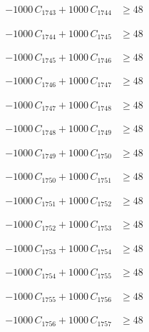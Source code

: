 \documentclass[a4paper,11pt]{article}
\begin{document}
\begin{align}
-1000\,C_{1743} + 1000\,C_{1744} &\geq 48 \nonumber
\end{align}

\begin{align}
-1000\,C_{1744} + 1000\,C_{1745} &\geq 48 \nonumber
\end{align}

\begin{align}
-1000\,C_{1745} + 1000\,C_{1746} &\geq 48 \nonumber
\end{align}

\begin{align}
-1000\,C_{1746} + 1000\,C_{1747} &\geq 48 \nonumber
\end{align}

\begin{align}
-1000\,C_{1747} + 1000\,C_{1748} &\geq 48 \nonumber
\end{align}

\begin{align}
-1000\,C_{1748} + 1000\,C_{1749} &\geq 48 \nonumber
\end{align}

\begin{align}
-1000\,C_{1749} + 1000\,C_{1750} &\geq 48 \nonumber
\end{align}

\begin{align}
-1000\,C_{1750} + 1000\,C_{1751} &\geq 48 \nonumber
\end{align}

\begin{align}
-1000\,C_{1751} + 1000\,C_{1752} &\geq 48 \nonumber
\end{align}

\begin{align}
-1000\,C_{1752} + 1000\,C_{1753} &\geq 48 \nonumber
\end{align}

\begin{align}
-1000\,C_{1753} + 1000\,C_{1754} &\geq 48 \nonumber
\end{align}

\begin{align}
-1000\,C_{1754} + 1000\,C_{1755} &\geq 48 \nonumber
\end{align}

\begin{align}
-1000\,C_{1755} + 1000\,C_{1756} &\geq 48 \nonumber
\end{align}

\begin{align}
-1000\,C_{1756} + 1000\,C_{1757} &\geq 48 \nonumber
\end{align}
\end{document}
